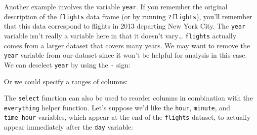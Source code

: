 \documentclass[12pt,]{krantz}
\makeatletter
\newenvironment{Shaded}{\begin{snugshade}}{\end{snugshade}}
\newcommand{\KeywordTok}[1]{\textcolor[rgb]{0.27,0.27,0.27}{\textbf{#1}}}
\newcommand{\StringTok}[1]{\textcolor[rgb]{0.5,0.5,0.5}{#1}}
\newcommand{\OperatorTok}[1]{\textcolor[rgb]{0.43,0.43,0.43}{\textbf{#1}}}
\newcommand{\NormalTok}[1]{#1}
\newenvironment{kframe}{%
\medskip{}
\setlength{\fboxsep}{.8em}
 \def\at@end@of@kframe{}%
 \ifinner\ifhmode%
  \def\at@end@of@kframe{\end{minipage}}%
  \begin{minipage}{\columnwidth}%
 \fi\fi%
 \def\FrameCommand##1{\hskip\@totalleftmargin \hskip-\fboxsep
 \colorbox{shadecolor}{##1}\hskip-\fboxsep
     \hskip-\linewidth \hskip-\@totalleftmargin \hskip\columnwidth}%
 \MakeFramed {\advance\hsize-\width
   \@totalleftmargin\z@ \linewidth\hsize
   \@setminipage}}%
 {\par\unskip\endMakeFramed%
 \at@end@of@kframe}
\renewenvironment{Shaded}{\begin{kframe}}{\end{kframe}}
\makeatother
\begin{document}
Another example involves the variable \texttt{year}. If you remember the
original description of the \texttt{flights} data frame (or by running
\texttt{?flights}), you'll remember that this data correspond to flights
in 2013 departing New York City. The \texttt{year} variable isn't really
a variable here in that it doesn't vary\ldots{} \texttt{flights}
actually comes from a larger dataset that covers many years. We may want
to remove the \texttt{year} variable from our dataset since it won't be
helpful for analysis in this case. We can deselect \texttt{year} by
using the \texttt{-} sign:

\begin{Shaded}
\end{Shaded}

Or we could specify a ranges of columns:

\begin{Shaded}
\end{Shaded}

The \texttt{select} function can also be used to reorder columns in
combination with the \texttt{everything} helper function. Let's suppose
we'd like the \texttt{hour}, \texttt{minute}, and \texttt{time\_hour}
variables, which appear at the end of the \texttt{flights} dataset, to
actually appear immediately after the \texttt{day} variable:

\begin{Shaded}
\end{Shaded}
\end{document}
